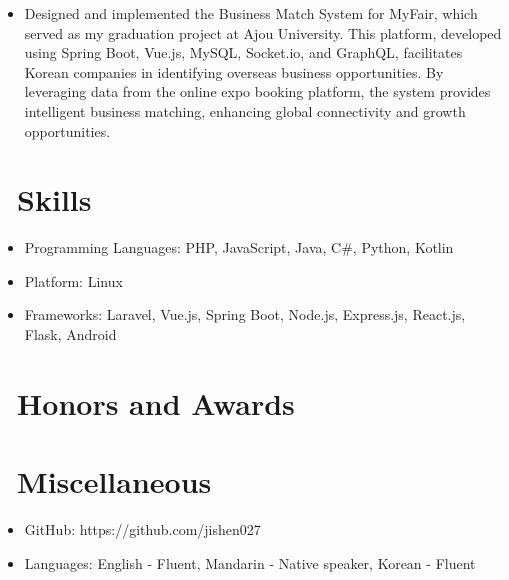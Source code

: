 \documentclass{resume}
\begin{document}
\begin{itemize}
  \item Designed and implemented the Business Match System for MyFair, which served as my graduation project at Ajou University. This platform, developed using Spring Boot, Vue.js, MySQL, Socket.io, and GraphQL, facilitates Korean companies in identifying overseas business opportunities. By leveraging data from the online expo booking platform, the system provides intelligent business matching, enhancing global connectivity and growth opportunities.
\end{itemize}

\section{\faCogs\ Skills}
\begin{itemize}[parsep=0.5ex]
  \item Programming Languages: PHP, JavaScript, Java, C#, Python, Kotlin
  \item Platform: Linux
  \item Frameworks: Laravel, Vue.js, Spring Boot, Node.js, Express.js, React.js, Flask, Android
\end{itemize}

\section{\faHeartO\ Honors and Awards}

\section{\faInfo\ Miscellaneous}
\begin{itemize}[parsep=0.5ex]
  \item GitHub: https://github.com/jishen027
  \item Languages: English - Fluent, Mandarin - Native speaker, Korean - Fluent
\end{itemize}

%
%
\end{document}
